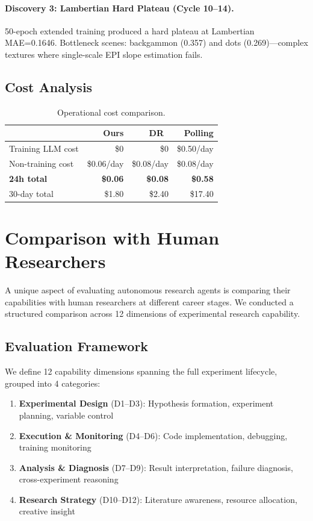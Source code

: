 \documentclass[11pt,a4paper]{article}
\begin{document}
\paragraph{Discovery 3: Lambertian Hard Plateau (Cycle 10--14).}
50-epoch extended training produced a hard plateau at Lambertian MAE=0.1646.
Bottleneck scenes: backgammon (0.357) and dots (0.269)---complex textures where single-scale EPI slope estimation fails.

\subsection{Cost Analysis}

\begin{table}[h]
\centering
\caption{Operational cost comparison.}
\label{tab:cost}
\begin{tabular}{l r r r}
\toprule
& \textbf{Ours} & \textbf{DR~\cite{zhang2026deep}} & \textbf{Polling} \\
\midrule
Training LLM cost & \$0 & \$0 & \$0.50/day \\
Non-training cost & \$0.06/day & \$0.08/day & \$0.08/day \\
\textbf{24h total} & \textbf{\$0.06} & \textbf{\$0.08} & \textbf{\$0.58} \\
30-day total & \$1.80 & \$2.40 & \$17.40 \\
\bottomrule
\end{tabular}
\end{table}


\section{Comparison with Human Researchers}
\label{sec:human_comparison}

A unique aspect of evaluating autonomous research agents is comparing their capabilities with human researchers at different career stages.
We conducted a structured comparison across 12 dimensions of experimental research capability.

\subsection{Evaluation Framework}

We define 12 capability dimensions spanning the full experiment lifecycle, grouped into 4 categories:

\begin{enumerate}
\item \textbf{Experimental Design} (D1--D3): Hypothesis formation, experiment planning, variable control
\item \textbf{Execution \& Monitoring} (D4--D6): Code implementation, debugging, training monitoring
\item \textbf{Analysis \& Diagnosis} (D7--D9): Result interpretation, failure diagnosis, cross-experiment reasoning
\item \textbf{Research Strategy} (D10--D12): Literature awareness, resource allocation, creative insight
\end{enumerate}
\end{document}
